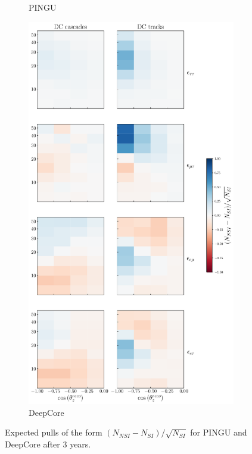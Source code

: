 \documentclass[draft=True]{revtex4-2}
\begin{document}
{{\begin{figure}[t]
\begin{center}
\begin{subfigure}{0.38\textwidth}
         \caption{PINGU}\label{fig:PINGU_event_pulls}
      \end{subfigure}
      \begin{subfigure}{0.4\textwidth}
         \includegraphics[width=1\linewidth]{figures/DC_event_pulls.pdf}
         \caption{DeepCore}\label{fig:DC_event_pulls}
      \end{subfigure}
    \end{center}
   \caption{Expected pulls of the form $(N_{NSI} - N_{SI})/\sqrt{N_{SI}}$ for PINGU and DeepCore after 3 years.}\label{fig:event_pulls} 
\end{figure}%



}}
\end{document}
